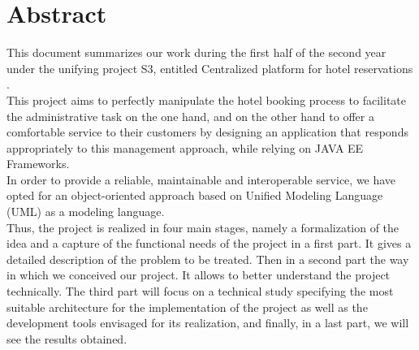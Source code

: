 \documentclass[12pt,a4paper]{report}
\begin{document}
	\chapter*{Abstract}
	This document summarizes our work during the first half of the second year under the unifying project S3, entitled \guillemotleft Centralized platform for hotel reservations \guillemotright.\\
This project aims to perfectly manipulate the hotel booking process to facilitate the administrative task on the one hand, and on the other hand to offer a comfortable service to their customers by designing an application that responds appropriately to this management approach, while relying on JAVA EE Frameworks.\\
In order to provide a reliable, maintainable and interoperable service, we have opted for an object-oriented approach based on Unified Modeling Language (UML) as a modeling language.\\
Thus, the project is realized in four main stages, namely a formalization of the idea and a capture of the functional needs of the project in a first part. It gives a detailed description of the problem to be treated. Then in a second part the way in which we conceived our project. It allows to better understand the project technically. The third part will focus on a technical study specifying the most suitable architecture for the implementation of the project as well as the development tools envisaged for its realization, and finally, in a last part, we will see the results obtained.\\


	\listoffigures
	\tableofcontents

\end{document}
